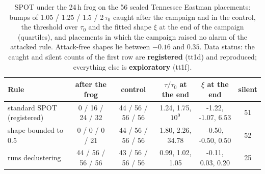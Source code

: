 \documentclass[letterpaper,twocolumn,10pt]{article}
\begin{document}
\begin{table}[t]
\caption{SPOT under the 24\,h frog on the 56 sealed Tennessee Eastman placements: bumps of 1.05 / 1.25 /
1.5 / 2\,$\tau_0$ caught after the campaign and in the control, the threshold over $\tau_0$ and the fitted
shape $\xi$ at the end of the campaign (quartiles), and placements in which the campaign raised no alarm
of the attacked rule. Attack-free shapes lie between $-0.16$ and $0.35$. Data status: the caught and silent
counts of the first row are \textbf{registered} (tt1d) and reproduced; everything else is \textbf{exploratory}
(tt1f).}
\label{tab:spotfrog}
\small
\begin{tabularx}{\textwidth}{@{}Lccccc@{}}
\toprule
Rule & after the frog & control & $\tau/\tau_0$ at the end & $\xi$ at the end & silent \\
\midrule
standard SPOT (registered) & 0 / 16 / 24 / 32 & 44 / 56 / 56 / 56 & 1.24, 1.75, $10^{9}$ & -1.22, -1.07, 6.53 & 51 \\
shape bounded to 0.5 & 0 / 0 / 0 / 21 & 44 / 56 / 56 / 56 & 1.80, 2.26, 34.78 & -0.50, -0.50, 0.50 & 52 \\
runs declustering & 44 / 56 / 56 / 56 & 43 / 56 / 56 / 56 & 0.99, 1.02, 1.05 & -0.11, 0.03, 0.20 & 25 \\
\bottomrule
\end{tabularx}
\end{table}
\end{document}

